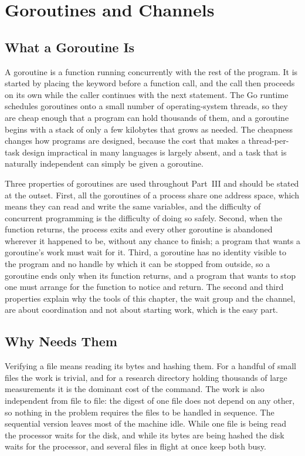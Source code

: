 \chapter{Goroutines and Channels}
\label{ch:goroutines}

\section{What a Goroutine Is}

A goroutine is a function running concurrently with the rest of the program. It is started by placing the keyword  before a function call, and the call then proceeds on its own while the caller continues with the next statement. The Go runtime schedules goroutines onto a small number of operating-system threads, so they are cheap enough that a program can hold thousands of them, and a goroutine begins with a stack of only a few kilobytes that grows as needed. The cheapness changes how programs are designed, because the cost that makes a thread-per-task design impractical in many languages is largely absent, and a task that is naturally independent can simply be given a goroutine.

Three properties of goroutines are used throughout Part~III and should be stated at the outset. First, all the goroutines of a process share one address space, which means they can read and write the same variables, and the difficulty of concurrent programming is the difficulty of doing so safely. Second, when the  function returns, the process exits and every other goroutine is abandoned wherever it happened to be, without any chance to finish; a program that wants a goroutine's work must wait for it. Third, a goroutine has no identity visible to the program and no handle by which it can be stopped from outside, so a goroutine ends only when its function returns, and a program that wants to stop one must arrange for the function to notice and return. The second and third properties explain why the tools of this chapter, the wait group and the channel, are about coordination and not about starting work, which is the easy part.

\section{Why \golab{} Needs Them}

Verifying a file means reading its bytes and hashing them. For a handful of small files the work is trivial, and for a research directory holding thousands of large measurements it is the dominant cost of the  command. The work is also independent from file to file: the digest of one file does not depend on any other, so nothing in the problem requires the files to be handled in sequence. The sequential version leaves most of the machine idle. While one file is being read the processor waits for the disk, and while its bytes are being hashed the disk waits for the processor, and several files in flight at once keep both busy.

